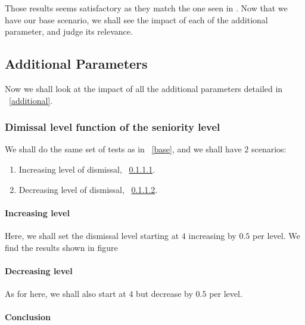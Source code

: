 \documentclass[11pt]{article}
\begin{document}
Those results seems satisfactory as they match the one seen in \cite{petercomp}. Now that we have our base scenario, we shall see the impact of each of the additional parameter, and judge its relevance.

\subsection{Additional Parameters}
Now we shall look at the impact of all the additional parameters detailed in ~\ref{additional}.

\subsubsection{Dimissal level function of the seniority level}
We shall do the same set of tests as in ~\ref{base}, and we shall have $2$ scenarios:

\begin{enumerate}
\item Increasing level of dismissal, ~\ref{inc}.
\item Decreasing level of dismissal, ~\ref{dec}.
\end{enumerate}

\paragraph{Increasing level}
\label{inc}
Here, we shall set the dismissal level starting at $4$ increasing by $0.5$ per level. We find the results shown in figure %

\paragraph{Decreasing level}
\label{dec}
As for here, we shall also start at $4$ but decrease by $0.5$ per level.

\paragraph{Conclusion}




\end{document}
